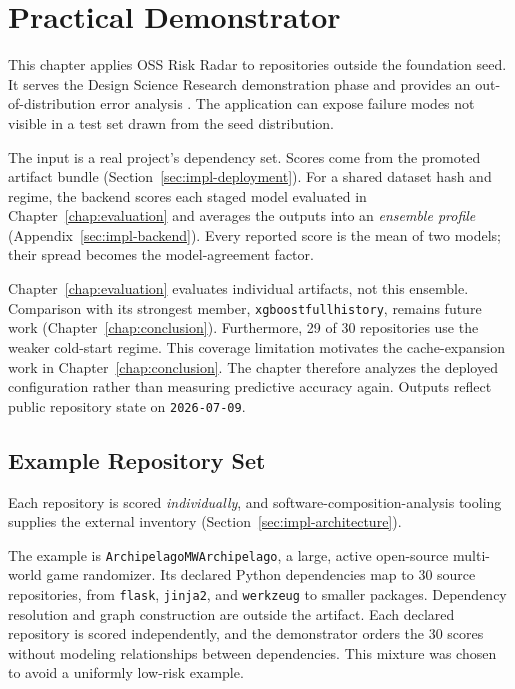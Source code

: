 \chapter{Practical Demonstrator}
\label{chap:demonstrator}

This chapter applies OSS Risk Radar to repositories outside the foundation seed.
It serves the Design Science Research demonstration phase and provides an
out-of-distribution error analysis
\cite{hevner2004design,peffers2007design}. The application can expose failure
modes not visible in a test set drawn from the seed distribution.

The input is a real project's dependency set. Scores come from the promoted
artifact bundle (Section~\ref{sec:impl-deployment}). For a shared dataset hash
and regime, the backend scores each staged model evaluated in
Chapter~\ref{chap:evaluation} and averages the outputs into an
\emph{ensemble profile} (Appendix~\ref{sec:impl-backend}). Every reported score
is the mean of two models; their spread becomes the model-agreement factor.

Chapter~\ref{chap:evaluation} evaluates individual artifacts, not this ensemble.
Comparison with its strongest member,
\texttt{xgboost\sdash full\sdash history}, remains future work
(Chapter~\ref{chap:conclusion}). Furthermore, 29 of 30 repositories use the
weaker cold-start regime. This coverage limitation motivates the cache-expansion
work in Chapter~\ref{chap:conclusion}. The chapter therefore analyzes the deployed
configuration rather than measuring predictive accuracy again. Outputs reflect
public repository state on \texttt{2026-07-09}.

\section{Example Repository Set}
\label{sec:demo-mapping}

Each repository is scored \emph{individually}, and
software-composition-analysis tooling supplies the external inventory
\cite{ortAnalyzer} (Section~\ref{sec:impl-architecture}).

The example is \texttt{ArchipelagoMW\sslash Archipelago}, a large, active
open-source multi-world game randomizer. Its declared Python dependencies map to
30 source repositories, from \texttt{flask}, \texttt{jinja2}, and
\texttt{werkzeug} to smaller packages. Dependency resolution and graph
construction are outside the artifact. Each declared repository is scored
independently, and the demonstrator orders the 30 scores without modeling
relationships between dependencies. This mixture was
chosen to avoid a uniformly low-risk example.

